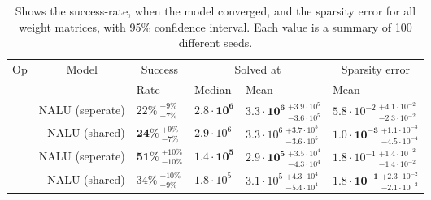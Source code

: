 \begin{table}[!h]

\caption{\label{tab:simple-function-static-nalu-gate-table}Shows the success-rate, when the model converged, and the sparsity error for all weight matrices, with 95\% confidence interval. Each value is a summary of 100 different seeds.}
\centering
\begin{tabular}{crllll}
\toprule
\multicolumn{1}{c}{Op} & \multicolumn{1}{c}{Model} & \multicolumn{1}{c}{Success} & \multicolumn{2}{c}{Solved at} & \multicolumn{1}{c}{Sparsity error} \\
\cmidrule(l{3pt}r{3pt}){1-1} \cmidrule(l{3pt}r{3pt}){2-2} \cmidrule(l{3pt}r{3pt}){3-3} \cmidrule(l{3pt}r{3pt}){4-5} \cmidrule(l{3pt}r{3pt}){6-6}
 &  & Rate & Median & Mean & Mean\\
\midrule
 & NALU (seperate) & $22\% {~}^{+9\%}_{-7\%}$ & $\mathbf{2.8 \cdot 10^{6}}$ & $\mathbf{3.3 \cdot 10^{6}} {~}^{+3.9 \cdot 10^{5}}_{-3.6 \cdot 10^{5}}$ & $5.8 \cdot 10^{-2} {~}^{+4.1 \cdot 10^{-2}}_{-2.3 \cdot 10^{-2}}$\\

\nopagebreak
\multirow{-2}{*}{\centering\arraybackslash $\bm{\times}$} & NALU (shared) & $\mathbf{24\%} {~}^{+9\%}_{-7\%}$ & $2.9 \cdot 10^{6}$ & $3.3 \cdot 10^{6} {~}^{+3.7 \cdot 10^{5}}_{-3.6 \cdot 10^{5}}$ & $\mathbf{1.0 \cdot 10^{-3}} {~}^{+1.1 \cdot 10^{-3}}_{-4.5 \cdot 10^{-4}}$\\
\cmidrule{1-6}
 & NALU (seperate) & $\mathbf{51\%} {~}^{+10\%}_{-10\%}$ & $\mathbf{1.4 \cdot 10^{5}}$ & $\mathbf{2.9 \cdot 10^{5}} {~}^{+3.5 \cdot 10^{4}}_{-4.3 \cdot 10^{4}}$ & $1.8 \cdot 10^{-1} {~}^{+1.4 \cdot 10^{-2}}_{-1.4 \cdot 10^{-2}}$\\

\nopagebreak
\multirow{-2}{*}{\centering\arraybackslash $\bm{+}$} & NALU (shared) & $34\% {~}^{+10\%}_{-9\%}$ & $1.8 \cdot 10^{5}$ & $3.1 \cdot 10^{5} {~}^{+4.3 \cdot 10^{4}}_{-5.4 \cdot 10^{4}}$ & $\mathbf{1.8 \cdot 10^{-1}} {~}^{+2.3 \cdot 10^{-2}}_{-2.1 \cdot 10^{-2}}$\\
\bottomrule
\end{tabular}
\end{table}
